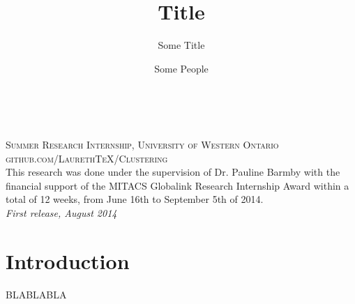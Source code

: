 \documentclass{awesome} %
\begin{document}

\title{Title}
\subtitle{Some Title}
\author{Some People}


\makefrontpage


\newpage
~\vfill
\thispagestyle{empty}


\noindent \textsc{Summer Research Internship, University of Western Ontario}\\

\noindent \textsc{github.com/LaurethTeX/Clustering}\\ %

\noindent This research was done under the supervision of Dr. Pauline Barmby with the financial support of the MITACS Globalink Research Internship Award within a total of 12 weeks, from June 16th to September 5th of 2014.\\ %

\noindent \textit{First release, August 2014} %



\tableofcontents

\chapter{Introduction}
BLABLABLA

\nocite{*}
\printbibliography
\end{document}
